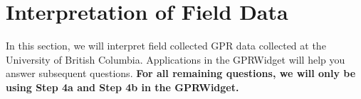 \documentclass[twosides]{EOSC350Lab} %
\begin{document}










\section*{Interpretation of Field Data}
In this section, we will interpret field collected GPR data collected at the University of British Columbia. Applications in the GPRWidget will help you answer subsequent questions. {\bf For all remaining questions, we will only be using Step 4a and Step 4b in the GPRWidget.}





%
%
%
%
%
%
%
%
\end{document}
